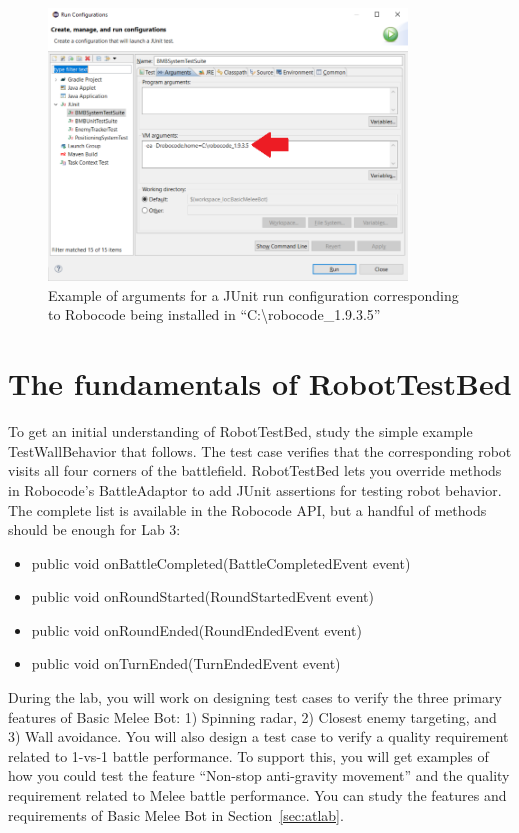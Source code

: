 \documentclass{scrreprt}
\begin{document}
\begin{figure}
\centering
\includegraphics[width=0.85\textwidth]{figures/runConfig.png}
\caption{Example of arguments for a JUnit run configuration corresponding to Robocode being installed in ``C:\textbackslash robocode\_1.9.3.5''}
\label{fig:runConfig}
\end{figure}

\newpage

\section{The fundamentals of RobotTestBed}
To get an initial understanding of RobotTestBed, study the simple example TestWallBehavior that follows. The test case verifies that the corresponding robot visits all four corners of the battlefield. RobotTestBed lets you override methods in Robocode's BattleAdaptor to add JUnit assertions for testing robot behavior. The complete list is available in the Robocode API, but a handful of methods should be enough for Lab 3:
\begin{itemize}
\item public void onBattleCompleted(BattleCompletedEvent event)
\item public void onRoundStarted(RoundStartedEvent event)
\item public void onRoundEnded(RoundEndedEvent event)
\item public void onTurnEnded(TurnEndedEvent event)
\end{itemize}

During the lab, you will work on designing test cases to verify the three primary features of Basic Melee Bot: 1) Spinning radar, 2) Closest enemy targeting,  and 3) Wall avoidance. You will also design a test case to verify a quality requirement related to 1-vs-1 battle performance. To support this, you will get examples of how you could test the feature ``Non-stop anti-gravity movement'' and the quality requirement related to Melee battle performance. You can study the features and requirements of Basic Melee Bot in Section~\ref{sec:atlab}. 
\end{document}
